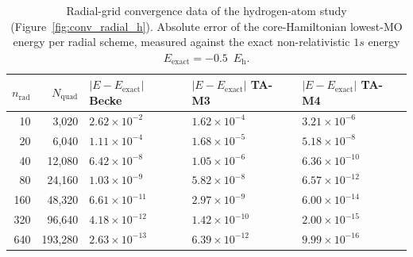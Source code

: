 \begin{table}[H]
  \centering\small
  \begin{tabular}{@{}rrlll@{}}
    \toprule
    $n_\mathrm{rad}$ & $N_\mathrm{quad}$ & $|E-E_\mathrm{exact}|$ Becke & $|E-E_\mathrm{exact}|$ TA-M3 & $|E-E_\mathrm{exact}|$ TA-M4 \\
    \midrule
    10 & 3,020 & $2.62\times10^{-2}$ & $1.62\times10^{-4}$ & $3.21\times10^{-6}$ \\
    20 & 6,040 & $1.11\times10^{-4}$ & $1.68\times10^{-5}$ & $5.18\times10^{-8}$ \\
    40 & 12,080 & $6.42\times10^{-8}$ & $1.05\times10^{-6}$ & $6.36\times10^{-10}$ \\
    80 & 24,160 & $1.03\times10^{-9}$ & $5.82\times10^{-8}$ & $6.57\times10^{-12}$ \\
    160 & 48,320 & $6.61\times10^{-11}$ & $2.97\times10^{-9}$ & $6.00\times10^{-14}$ \\
    320 & 96,640 & $4.18\times10^{-12}$ & $1.42\times10^{-10}$ & $2.00\times10^{-15}$ \\
    640 & 193,280 & $2.63\times10^{-13}$ & $6.39\times10^{-12}$ & $9.99\times10^{-16}$ \\
    \bottomrule
  \end{tabular}
  \caption{Radial-grid convergence data of the hydrogen-atom study (Figure~\ref{fig:conv_radial_h}). Absolute error of the core-Hamiltonian lowest-MO energy per radial scheme, measured against the exact non-relativistic $1s$ energy $E_\mathrm{exact}=-0.5$~$E_\mathrm{h}$.}
  \label{tab:data_radial_h}
\end{table}
